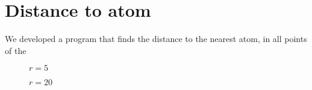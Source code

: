 \section{Distance to atom}

We developed a program that finds the distance to the nearest atom, in all points of the 
%
\setlength{\myfigwidth}{0.90\textwidth}%
\begin{figure}[htpb]%
    \centering%
    \caption{$r = 5$ \Ang}%
    \label{fig:distance_to_atom_r05}%
\end{figure}%
%
\begin{figure}[htpb]%
    \centering%
    \caption{$r = 20$ \Ang}%
    \label{fig:distance_to_atom_r20}%
\end{figure}%